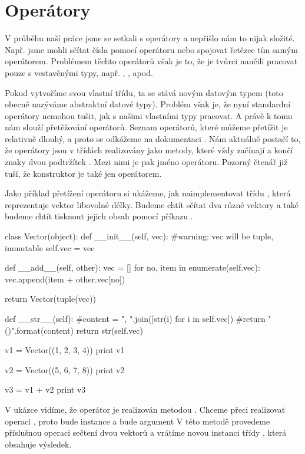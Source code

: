 \section{Operátory}

V průběhu naší práce jsme se setkali s operátory a nepřišlo nám to nijak složité. Např. jsme mohli sčítat
čísla pomocí operátoru \kod{+} nebo spojovat řetězce tím samým operátorem. Problémem těchto operátorů však
je to, že je tvůrci naučili pracovat pouze s vestavěnými typy, např. , , apod.

Pokud vytvoříme svou vlastní třídu, ta se stává novým datovým typem (toto obecně nazýváme abstraktní datové
typy). Problém však je, že nyní standardní operátory nemohou tušit, jak s našimi vlastními typy pracovat.
A právě k tomu nám slouží přetěžování operátorů. Seznam operátorů, které můžeme přetížit je relativně dlouhý,
a proto se odkážeme na dokumentaci \cite{python-operator-overloading}. Nám aktuálně postačí to, že operátory
jsou v třídách realizovány jako metody, které vždy začínají a končí znaky dvou podtržítek \kod{\_\_}.
Mezi nimi je pak jméno operátoru. Pozorný čtenář již tuší, že konstruktor je také jen operátorem.

Jako příklad přetížení operátoru si ukážeme, jak naimplementovat třídu , která reprezentuje
vektor libovolné délky. Budeme chtít sčítat dva různé vektory a také budeme chtít tisknout jejich obsah
pomocí příkazu .

\begin{python}
class Vector(object):
    def __init__(self, vec):
        #warning: vec will be tuple, immutable
        self.vec = vec

    def __add__(self, other):
        vec = []
        for no, item in enumerate(self.vec):
            vec.append(item + other.vec[no])

        return Vector(tuple(vec))

    def __str__(self):
        #content = ", ".join([str(i) for i in self.vec])
        #return "({})".format(content)
        return str(self.vec)

v1 = Vector((1, 2, 3, 4))
print v1

v2 = Vector((5, 6, 7, 8))
print v2

v3 = v1 + v2
print v3
\end{python}

V ukázce vidíme, že operátor \kod{+} je realizován metodou .
 Chceme přeci realizovat operaci , proto 
bude instance  a  bude argument 
V této metodě provedeme příslušnou operaci sečtení dvou vektorů a vrátíme novou instanci třídy ,
která obsahuje výsledek.

